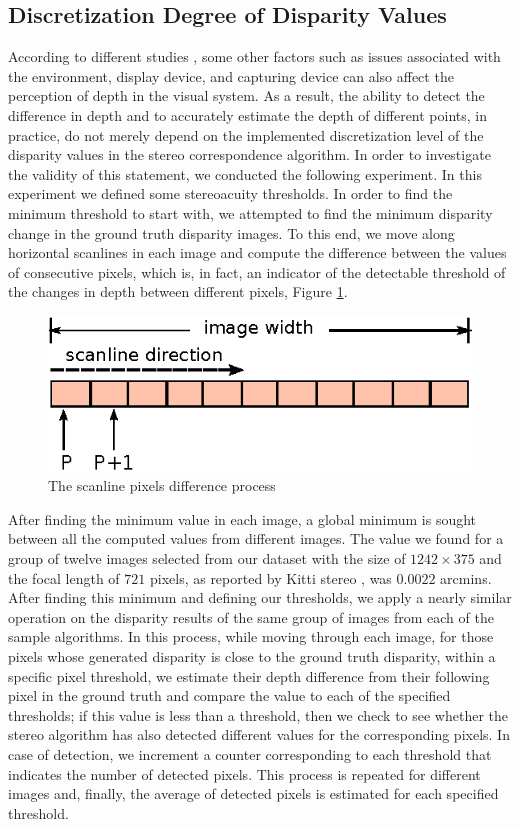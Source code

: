 \subsection{Discretization Degree of Disparity Values}
According to different studies \cite{dras96, kru10,azuma01}, some other factors such as issues associated with the environment, display device, and capturing device
can also affect the perception of depth in the visual system. As a result, the ability to detect the difference in depth and to accurately estimate the
depth of different points, in practice,
do not merely depend on the implemented discretization level of the disparity values in the stereo correspondence algorithm.
In order to investigate the validity of this statement, we conducted the following experiment. In this experiment we defined some stereoacuity thresholds. 
In order to find the minimum threshold to start with, we attempted to find the 
minimum disparity change in the ground truth disparity images. To this end, we move along horizontal scanlines in each image and 
compute the difference between the values of consecutive pixels, which is, in fact, an indicator of the detectable threshold of the changes in depth between
different pixels, Figure \ref{fig:scanline}. 

\begin{figure}[H]
\centering
\includegraphics{scanline}
\caption{The scanline pixels difference process}
\label{fig:scanline}
\end{figure} 

After finding the minimum value in each image, a global minimum is sought between all the computed values from different images.
The value we found for a group of twelve images selected from our dataset with the size of $1242\times375$ and the focal length of $721$ 
pixels, as reported by Kitti stereo \cite{kitti}, was $0.0022$ arcmins.
After finding this minimum and defining our thresholds, we apply a nearly similar operation on the disparity results of the same group of images 
from each of the sample algorithms.
In this process, while moving through each image, for those pixels whose generated disparity is close to the ground truth disparity, 
within a specific pixel threshold, 
we estimate their depth difference from their following pixel
in the ground truth and compare the value to each of the specified thresholds; if this value is less than a threshold, then we check to see whether
the stereo algorithm has also detected different values for the corresponding pixels. 
In case of detection, we increment a counter corresponding to each threshold that indicates the number of detected pixels.
This process is repeated for different images and, finally, the average of detected pixels is estimated for each specified threshold.

